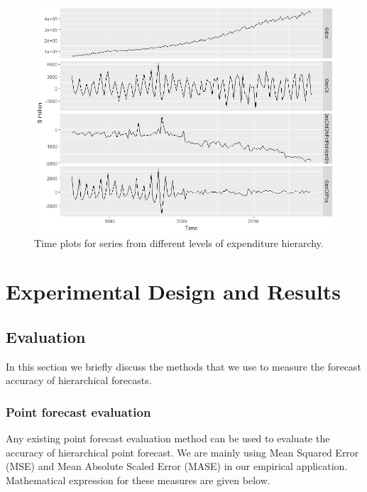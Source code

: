 \documentclass[graybox]{svmult}
\begin{document}
\begin{figure}[H]
	\centering
	\small
	\includegraphics[scale=0.50]{Figs/TS-plots/EXP-hierarchy/EXP-char-of-levels-TSplots.png}
	\caption{Time plots for series from different levels of expenditure hierarchy.}\label{TS-Exp}
\end{figure}


\clearpage	






\section{Experimental Design and Results}\label{sec:results}


\subsection{Evaluation}

In this section we briefly discuss the methods that we use to measure the forecast accuracy of hierarchical forecasts.

\subsubsection{Point forecast evaluation}

Any existing point forecast evaluation method can be used to evaluate the accuracy of hierarchical point forecast. We are mainly using Mean Squared Error (MSE) and Mean Absolute Scaled Error (MASE) in our empirical application. Mathematical expression for these measures are given below.
\end{document}
